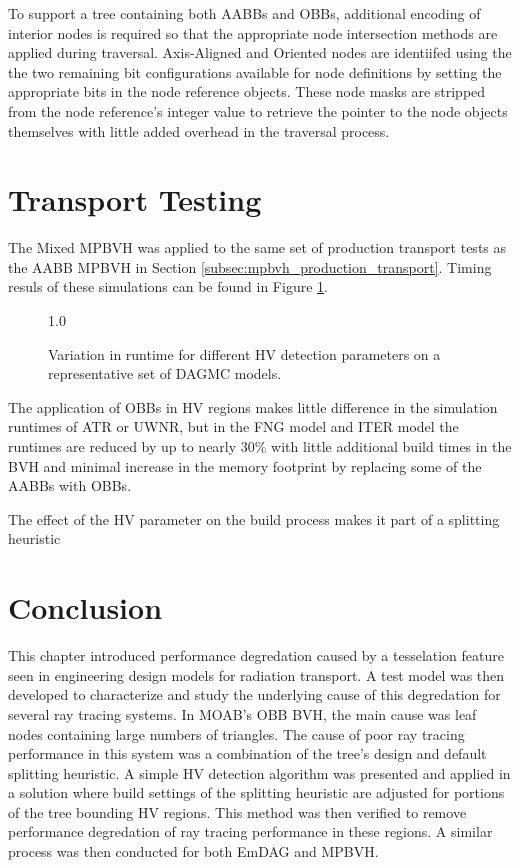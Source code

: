 To support a tree containing both AABBs and OBBs, additional encoding of
interior nodes is required so that the appropriate node intersection methods are
applied during traversal. Axis-Aligned and Oriented nodes are identiifed using
the the two remaining bit configurations available for node definitions by
setting the appropriate bits in the node reference objects. These node masks are
stripped from the node reference's integer value to retrieve the pointer to the
node objects themselves with little added overhead in the traversal process.

\section{Transport Testing}

The Mixed MPBVH was applied to the same set of production transport tests as the
AABB MPBVH in Section \ref{subsec:mpbvh_production_transport}. Timing resuls of
these simulations can be found in Figure \ref{fig:hv_parameter_study_simd}.

\begin{figure}[H]
  \centering
  {1.0\textwidth}
  \caption{Variation in runtime for different HV detection parameters on a
    representative set of DAGMC models.}
  \label{fig:hv_parameter_study_simd}
\end{figure}

The application of OBBs in HV regions makes little difference in the simulation
runtimes of ATR or UWNR, but in the FNG model and ITER model the runtimes are
reduced by up to nearly 30\% with little additional build times in the BVH and
minimal increase in the memory footprint by replacing some of the AABBs with
OBBs.

The effect of the HV parameter on the build process makes it part of a splitting heuristic

\section{Conclusion}

This chapter introduced performance degredation caused by a tesselation feature
seen in engineering design models for radiation transport. A test model was then
developed to characterize and study the underlying cause of this degredation for
several ray tracing systems. In MOAB's OBB BVH, the main cause was leaf nodes
containing large numbers of triangles. The cause of poor ray tracing performance
in this system was a combination of the tree's design and default splitting
heuristic. A simple HV detection algorithm was presented and applied in a
solution where build settings of the splitting heuristic are adjusted for
portions of the tree bounding HV regions. This method was then verified to
remove performance degredation of ray tracing performance in these regions. A
similar process was then conducted for both EmDAG and MPBVH.

